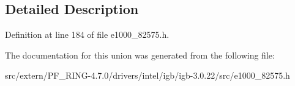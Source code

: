 \subsection{Detailed Description}


Definition at line 184 of file e1000\_\-82575.h.



The documentation for this union was generated from the following file:\begin{DoxyCompactItemize}
\item 
src/extern/PF\_\-RING-\/4.7.0/drivers/intel/igb/igb-\/3.0.22/src/e1000\_\-82575.h\end{DoxyCompactItemize}
